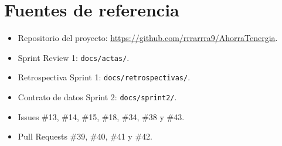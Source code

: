\documentclass[11pt,a4paper,oneside]{report}
\begin{document}
\section*{Fuentes de referencia}

\begin{itemize}
\item Repositorio del proyecto: \url{https://github.com/rrrarrra9/AhorraTenergia}.
\item Sprint Review 1: \texttt{docs/actas/}.
\item Retrospectiva Sprint 1: \texttt{docs/retrospectivas/}.
\item Contrato de datos Sprint 2: \texttt{docs/sprint2/}.
\item Issues \#13, \#14, \#15, \#18, \#34, \#38 y \#43.
\item Pull Requests \#39, \#40, \#41 y \#42.
\end{itemize}
\end{document}
